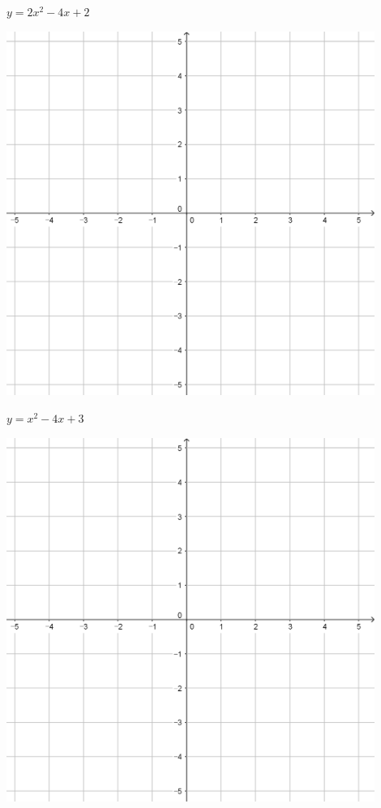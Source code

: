 \documentclass[a4paper]{oblivoir}
\begin{document}
\begin{minipage}{0.45\textwidth}\centering
\(y=2x^2-4x+2\)
\par\bigskip\includegraphics[width=0.9\textwidth]{55}
\end{minipage}
\begin{minipage}{0.45\textwidth}\centering
\(y=x^2-4x+3\)
\par\bigskip\includegraphics[width=0.9\textwidth]{55}
\end{minipage}\bigskip\bigskip\par
\end{document}
